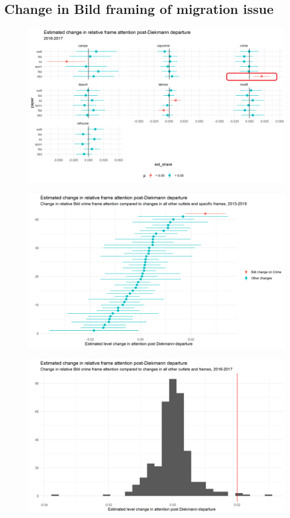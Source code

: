 \documentclass{article}
\begin{document}
\subsection{Change in Bild framing of migration issue}

\begin{figure}[!ht]
    \centering
    \includegraphics[width=\textwidth]{paper/vis/did_papers_frames_1617_scatter.png}
    \label{app:diekmann_all_frames}
\end{figure}

\begin{figure}[!ht]
    \centering
    \includegraphics[width=\textwidth]{paper/vis/did_papers_frames_all_scatter.png}
\end{figure}

\begin{figure}[!ht]
    \centering
    \includegraphics[width=\textwidth]{paper/vis/did_papers_allframes_1617_hist.png}
\end{figure}
\end{document}
